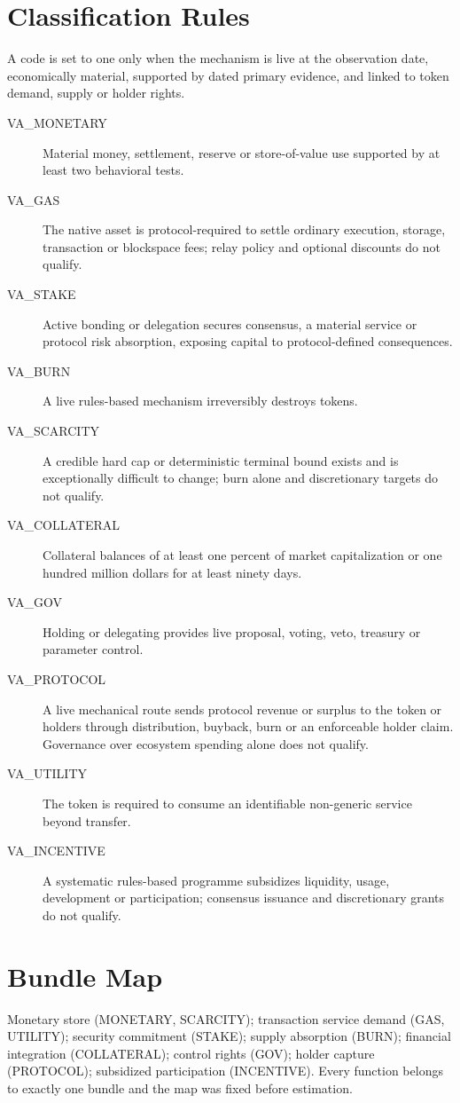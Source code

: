 \documentclass[10pt]{article}
\begin{document}
\section{Classification Rules}
A code is set to one only when the mechanism is live at the observation date, economically material, supported by dated primary evidence, and linked to token demand, supply or holder rights.
\begin{description}
  \item[VA\_MONETARY] Material money, settlement, reserve or store-of-value use supported by at least two behavioral tests.
  \item[VA\_GAS] The native asset is protocol-required to settle ordinary execution, storage, transaction or blockspace fees; relay policy and optional discounts do not qualify.
  \item[VA\_STAKE] Active bonding or delegation secures consensus, a material service or protocol risk absorption, exposing capital to protocol-defined consequences.
  \item[VA\_BURN] A live rules-based mechanism irreversibly destroys tokens.
  \item[VA\_SCARCITY] A credible hard cap or deterministic terminal bound exists and is exceptionally difficult to change; burn alone and discretionary targets do not qualify.
  \item[VA\_COLLATERAL] Collateral balances of at least one percent of market capitalization or one hundred million dollars for at least ninety days.
  \item[VA\_GOV] Holding or delegating provides live proposal, voting, veto, treasury or parameter control.
  \item[VA\_PROTOCOL] A live mechanical route sends protocol revenue or surplus to the token or holders through distribution, buyback, burn or an enforceable holder claim. Governance over ecosystem spending alone does not qualify.
  \item[VA\_UTILITY] The token is required to consume an identifiable non-generic service beyond transfer.
  \item[VA\_INCENTIVE] A systematic rules-based programme subsidizes liquidity, usage, development or participation; consensus issuance and discretionary grants do not qualify.
\end{description}

\section{Bundle Map}
Monetary store (MONETARY, SCARCITY); transaction service demand (GAS, UTILITY); security commitment (STAKE); supply absorption (BURN); financial integration (COLLATERAL); control rights (GOV); holder capture (PROTOCOL); subsidized participation (INCENTIVE). Every function belongs to exactly one bundle and the map was fixed before estimation.
\end{document}
